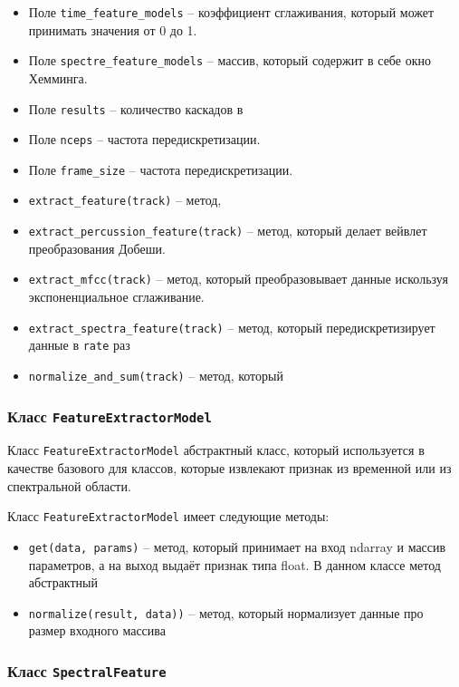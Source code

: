 \begin{itemize}
\item{Поле \texttt{time\_feature\_models} -- коэффициент сглаживания, который может принимать значения от 0 до 1.}
\item{Поле \texttt{spectre\_feature\_models} -- массив, который содержит в себе окно Хемминга.}
\item{Поле \texttt{results} -- количество каскадов в }
\item{Поле \texttt{nceps} -- частота передискретизации.}
\item{Поле \texttt{frame\_size} -- частота передискретизации.}
\item{\texttt{extract\_feature(track)} -- метод, }
\item{\texttt{extract\_percussion\_feature(track)} -- метод, который  делает вейвлет преобразования Добеши. }
\item{\texttt{extract\_mfcc(track)} -- метод, который преобразовывает данные искользуя экспоненциальное сглаживание.}
\item{\texttt{extract\_spectra\_feature(track)} -- метод, который передискретизирует данные в \texttt{rate} раз }
\item{\texttt{normalize\_and\_sum(track)} -- метод, который}
\end{itemize}

\subsubsection{Класс \texttt{FeatureExtractorModel}}

Класс \texttt{FeatureExtractorModel} абстрактный класс, который используется в качестве базового для классов, которые извлекают признак из временной или из спектральной области.

Класс \texttt{FeatureExtractorModel} имеет следующие методы:

\begin{itemize}
\item{\texttt{get(data, params)} -- метод, который принимает на вход ndarray и массив параметров, а на выход выдаёт признак типа float. В данном классе метод абстрактный }
\item{\texttt{normalize(result, data))} -- метод, который нормализует данные про размер входного массива}
\end{itemize}



\subsubsection{Класс \texttt{SpectralFeature}}

